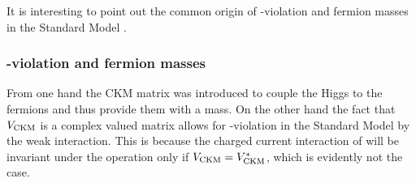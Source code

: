 It is interesting to point out the common origin of \CP-violation and fermion masses in the Standard Model \cite{KM-mechanism}.
\subsubsection{\CP-violation and fermion masses}
From one hand the CKM matrix was introduced to couple the Higgs to the fermions and thus provide them with a mass.
On the other hand the fact that $V_{\rm CKM}$ is a complex valued matrix allows for \CP-violation in the
Standard Model by the weak interaction. This is because the charged current interaction of 
will be invariant under the \CP operation only if $V_{\rm CKM}=V_{\rm CKM}^*$, which is evidently not the case.
